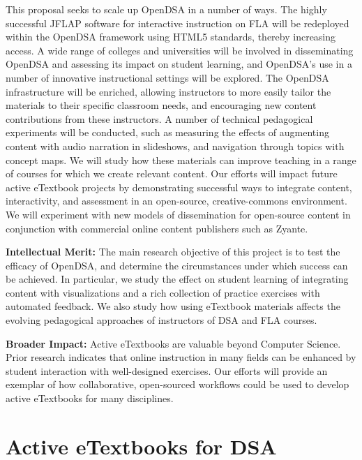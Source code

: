 \documentclass[11pt]{article}
\begin{document}
This proposal seeks to scale up OpenDSA in a number of ways.
The highly successful JFLAP software for interactive instruction on
FLA will be redeployed within the OpenDSA framework using HTML5
standards, thereby increasing access.
A wide range of colleges and universities will be involved in
disseminating OpenDSA and assessing its impact on student learning,
and OpenDSA's use in a number of innovative instructional settings
will be explored.
The OpenDSA infrastructure will be enriched, allowing instructors
to more easily tailor the materials to their specific classroom needs,
and encouraging new content contributions from these instructors.
A number of technical pedagogical experiments will be conducted,
such as measuring the effects of augmenting content with audio
narration in slideshows,
and navigation through topics with concept maps.
We will study how these materials can improve teaching in a range of
courses for which we create relevant content.
Our efforts will impact future active eTextbook projects by
demonstrating successful ways to integrate content,
interactivity, and assessment in an open-source, creative-commons
environment.
We will experiment with new models of dissemination for open-source
content in conjunction with commercial online content publishers such
as Zyante.

\textbf{Intellectual Merit:}
The main research objective of this project is to test the efficacy of
OpenDSA, and determine the circumstances under which success can be
achieved.
In particular, we study the effect on student learning of integrating
content with visualizations and a rich collection of practice
exercises with automated feedback.
We also study how using eTextbook materials affects the
evolving pedagogical approaches of instructors of DSA and FLA courses.

\textbf{Broader Impact:}
Active eTextbooks are valuable beyond Computer Science.
Prior research indicates that online instruction in many fields can
be enhanced by student interaction with well-designed exercises.
Our efforts will provide an exemplar of how collaborative,
open-sourced workflows could be used to develop
active eTextbooks for many disciplines.

\newpage
\setcounter{page}{1}
\pagestyle{plain}
\section{Active eTextbooks for DSA}
\label{ProblemSec}
\end{document}
